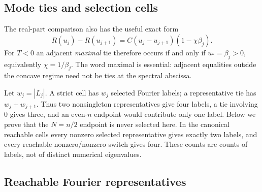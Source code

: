 \subsection{Mode ties and selection cells}
\label{slot:P05-3}
The real-part comparison also has the useful exact form
\begin{equation}
 R(u_j)-R(u_{j+1})
       =C(u_j-u_{j+1})(1-\chi\beta_j).
 \label{eq:P05-adjacent-gap}
\end{equation}
For $T<0$ an adjacent \emph{maximal} tie therefore occurs if and only
if $u_*=\beta_j>0$, equivalently $\chi=1/\beta_j$.
The word maximal is essential: adjacent equalities outside the concave
regime need not be ties at the spectral abscissa.

Let $w_j=|L_j|$. A strict cell has $w_j$ selected Fourier labels; a
representative tie has $w_j+w_{j+1}$. Thus two nonsingleton
representatives give four labels, a tie involving $0$ gives three,
and an even-$n$ endpoint would contribute only one label. Below we prove
that the $N=n/2$ endpoint is never selected here. In the canonical
reachable cells every nonzero selected representative gives exactly two
labels, and every reachable nonzero/nonzero switch gives four.
These counts are counts of labels, not of distinct numerical eigenvalues.

\subsection{Reachable Fourier representatives}

